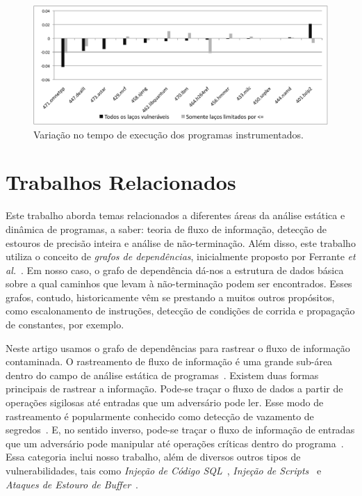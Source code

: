 \documentclass{llncs}
\begin{document}
\begin{figure}[t!]
\begin{center}
\includegraphics[width=1\textwidth]{images/runtime}
\caption{Variação no tempo de execução dos programas instrumentados.}
\label{fig:runtime}
\end{center}
\end{figure}

\section{Trabalhos Relacionados}
\label{sec:rel}

Este trabalho aborda temas relacionados a diferentes áreas da análise estática
e dinâmica de programas, a saber: teoria de fluxo de informação, detecção de
estouros de precisão inteira e análise de não-terminação.
Além disso, este trabalho utiliza o conceito de {\em grafos de dependências},
inicialmente proposto por Ferrante {\em et al.}~\cite{Ferrante87}.
Em nosso caso, o grafo de dependência dá-nos a estrutura de dados básica sobre
a qual caminhos que levam à não-terminação podem ser encontrados.
Esses grafos, contudo, historicamente vêm se prestando a muitos outros
propósitos, como escalonamento de instruções, detecção de condições de corrida e
propagação de constantes, por exemplo.

Neste artigo usamos o grafo de dependências para rastrear o fluxo de
informação contaminada.
O rastreamento de fluxo de informação é uma grande sub-área dentro do campo de
análise estática de programas~\cite{Denning77}.
Existem duas formas principais de rastrear a informação.
Pode-se traçar o fluxo de dados a partir de operações sigilosas até entradas
que um adversário pode ler.
Esse modo de rastreamento é popularmente conhecido como detecção de vazamento
de segredos~\cite{Hammer06,Quadros11}.
E, no sentido inverso, pode-se traçar o fluxo de informação de entradas que
um adversário pode manipular até operações críticas dentro do
programa~\cite{Tripp09}.
Essa categoria inclui nosso trabalho, além de diversos outros tipos de
vulnerabilidades, tais como {\em Injeção de Código SQL}~\cite{Wassermann07},
{\em Injeção de Scripts}~\cite{Rimsa10} e {\em Ataques de Estouro de
Buffer}~\cite{Levy96}.
\end{document}
